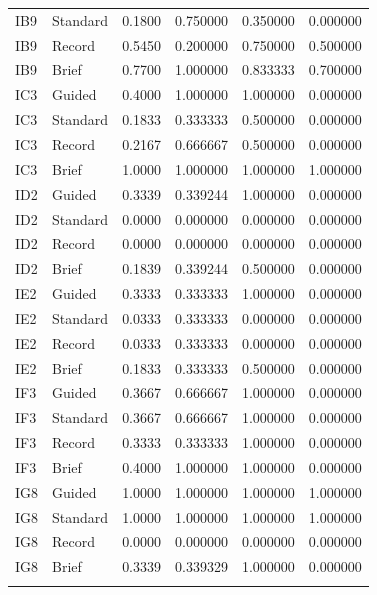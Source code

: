 \begin{longtable}{@{}llrrrr@{}}
IB9 & Standard & 0.1800 & 0.750000 & 0.350000 & 0.000000 \\
IB9 & Record & 0.5450 & 0.200000 & 0.750000 & 0.500000 \\
IB9 & Brief & 0.7700 & 1.000000 & 0.833333 & 0.700000 \\
\addlinespace[3pt]
IC3 & Guided & 0.4000 & 1.000000 & 1.000000 & 0.000000 \\
IC3 & Standard & 0.1833 & 0.333333 & 0.500000 & 0.000000 \\
IC3 & Record & 0.2167 & 0.666667 & 0.500000 & 0.000000 \\
IC3 & Brief & 1.0000 & 1.000000 & 1.000000 & 1.000000 \\
\addlinespace[3pt]
ID2 & Guided & 0.3339 & 0.339244 & 1.000000 & 0.000000 \\
ID2 & Standard & 0.0000 & 0.000000 & 0.000000 & 0.000000 \\
ID2 & Record & 0.0000 & 0.000000 & 0.000000 & 0.000000 \\
ID2 & Brief & 0.1839 & 0.339244 & 0.500000 & 0.000000 \\
\addlinespace[3pt]
IE2 & Guided & 0.3333 & 0.333333 & 1.000000 & 0.000000 \\
IE2 & Standard & 0.0333 & 0.333333 & 0.000000 & 0.000000 \\
IE2 & Record & 0.0333 & 0.333333 & 0.000000 & 0.000000 \\
IE2 & Brief & 0.1833 & 0.333333 & 0.500000 & 0.000000 \\
\addlinespace[3pt]
IF3 & Guided & 0.3667 & 0.666667 & 1.000000 & 0.000000 \\
IF3 & Standard & 0.3667 & 0.666667 & 1.000000 & 0.000000 \\
IF3 & Record & 0.3333 & 0.333333 & 1.000000 & 0.000000 \\
IF3 & Brief & 0.4000 & 1.000000 & 1.000000 & 0.000000 \\
\addlinespace[3pt]
IG8 & Guided & 1.0000 & 1.000000 & 1.000000 & 1.000000 \\
IG8 & Standard & 1.0000 & 1.000000 & 1.000000 & 1.000000 \\
IG8 & Record & 0.0000 & 0.000000 & 0.000000 & 0.000000 \\
IG8 & Brief & 0.3339 & 0.339329 & 1.000000 & 0.000000 \\
\addlinespace[3pt]
\end{longtable}
\endgroup

